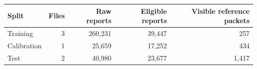 \begin{tabular*}{\linewidth}{@{\extracolsep{\fill}}lrrrr@{}}\toprule
Split & Files & Raw reports & Eligible reports & Visible reference packets \\\midrule
Training & 3 & 260,231 & 39,447 & 257 \\
Calibration & 1 & 25,659 & 17,252 & 434 \\
Test & 2 & 40,980 & 23,677 & 1,417 \\
\bottomrule\end{tabular*}
